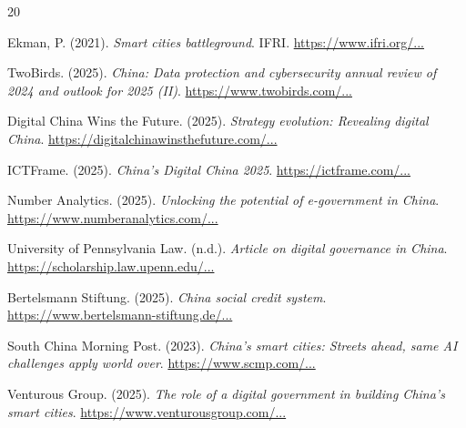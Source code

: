 \documentclass[12pt,a4paper]{article}
\begin{document}
\usepackage{hyperref} %

\newpage
\begin{thebibliography}{20}

Ekman, P. (2021). \textit{Smart cities battleground}. IFRI. 
\href{https://www.ifri.org/sites/default/files/migrated_files/documents/atoms/files/ekman_smart_cities_battleground.pdf}{https://www.ifri.org/...}

TwoBirds. (2025). \textit{China: Data protection and cybersecurity annual review of 2024 and outlook for 2025 (II)}. 
\href{https://www.twobirds.com/en/insights/2025/china/china-data-protection-and-cybersecurity-annual-review-of-2024-and-outlook-for-2025-(ii)}{https://www.twobirds.com/...}

Digital China Wins the Future. (2025). \textit{Strategy evolution: Revealing digital China}. 
\href{https://digitalchinawinsthefuture.com/strategy-evolution-revealing-digital-china/}{https://digitalchinawinsthefuture.com/...}

ICTFrame. (2025). \textit{China’s Digital China 2025}. 
\href{https://ictframe.com/chinas-digital-china-2025/}{https://ictframe.com/...}

Number Analytics. (2025). \textit{Unlocking the potential of e-government in China}. 
\href{https://www.numberanalytics.com/blog/unlocking-potential-e-government-china}{https://www.numberanalytics.com/...}

University of Pennsylvania Law. (n.d.). \textit{Article on digital governance in China}. 
\href{https://scholarship.law.upenn.edu/cgi/viewcontent.cgi?article=1072&context=alr}{https://scholarship.law.upenn.edu/...}

Bertelsmann Stiftung. (2025). \textit{China social credit system}. 
\href{https://www.bertelsmann-stiftung.de/fileadmin/files/aam/Asia-Book_A_03_China_Social_Credit_System.pdf}{https://www.bertelsmann-stiftung.de/...}

South China Morning Post. (2023). \textit{China’s smart cities: Streets ahead, same AI challenges apply world over}. 
\href{https://www.scmp.com/news/china/politics/article/3312375/chinas-smart-cities-streets-ahead-same-ai-challenges-apply-world-over}{https://www.scmp.com/...}

Venturous Group. (2025). \textit{The role of a digital government in building China’s smart cities}. 
\href{https://www.venturousgroup.com/resources/the-role-of-a-digital-government-in-building-chinas-smart-cities/}{https://www.venturousgroup.com/...}


\end{thebibliography}
\end{document}
